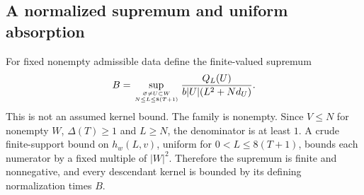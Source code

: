 \documentclass[11pt,a4paper]{article}
\numberwithin{equation}{section}
\theoremstyle{definition}
\begin{document}
\subsection{A normalized supremum and uniform absorption}
For fixed nonempty admissible data define the finite-valued supremum
\begin{equation*}
 B=\sup_{\varnothing\ne U\subset W\atop N\le L\le8(T+1)}
 \frac{Q_L(U)}{b|U|(L^2+Nd_U)}.
\end{equation*}
This is not an assumed kernel bound. The family is nonempty. Since $V\le N$
for nonempty $W$, $\Delta(T)\ge1$ and $L\ge N$, the denominator is at least
$1$. A crude finite-support bound on $h_w(L,v)$, uniform for
$0<L\le8(T+1)$, bounds each numerator by a fixed multiple of $|W|^2$.
Therefore the supremum is finite and nonnegative, and every descendant kernel
is bounded by its defining normalization times $B$.
\end{document}
